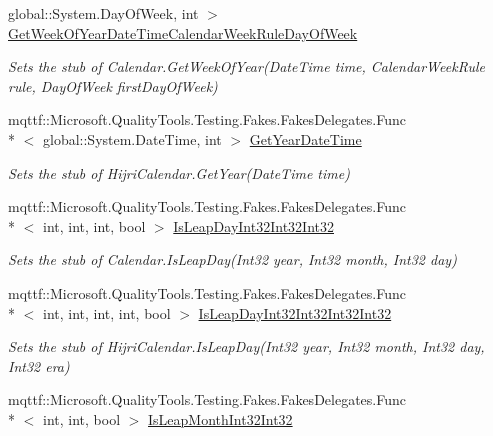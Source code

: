 \begin{DoxyCompactItemize}
global\-::\-System.\-Day\-Of\-Week, int $>$ \hyperlink{class_system_1_1_globalization_1_1_fakes_1_1_stub_hijri_calendar_a2c01dec10f24678568a180ce995d7b8c}{Get\-Week\-Of\-Year\-Date\-Time\-Calendar\-Week\-Rule\-Day\-Of\-Week}
\begin{DoxyCompactList}\small\item\em Sets the stub of Calendar.\-Get\-Week\-Of\-Year(\-Date\-Time time, Calendar\-Week\-Rule rule, Day\-Of\-Week first\-Day\-Of\-Week)\end{DoxyCompactList}\item 
mqttf\-::\-Microsoft.\-Quality\-Tools.\-Testing.\-Fakes.\-Fakes\-Delegates.\-Func\\*
$<$ global\-::\-System.\-Date\-Time, int $>$ \hyperlink{class_system_1_1_globalization_1_1_fakes_1_1_stub_hijri_calendar_a1ad2b061ae2eb559aa563aaac04d6aa9}{Get\-Year\-Date\-Time}
\begin{DoxyCompactList}\small\item\em Sets the stub of Hijri\-Calendar.\-Get\-Year(\-Date\-Time time)\end{DoxyCompactList}\item 
mqttf\-::\-Microsoft.\-Quality\-Tools.\-Testing.\-Fakes.\-Fakes\-Delegates.\-Func\\*
$<$ int, int, int, bool $>$ \hyperlink{class_system_1_1_globalization_1_1_fakes_1_1_stub_hijri_calendar_ac699c2ca19599f059223ee1640838876}{Is\-Leap\-Day\-Int32\-Int32\-Int32}
\begin{DoxyCompactList}\small\item\em Sets the stub of Calendar.\-Is\-Leap\-Day(\-Int32 year, Int32 month, Int32 day)\end{DoxyCompactList}\item 
mqttf\-::\-Microsoft.\-Quality\-Tools.\-Testing.\-Fakes.\-Fakes\-Delegates.\-Func\\*
$<$ int, int, int, int, bool $>$ \hyperlink{class_system_1_1_globalization_1_1_fakes_1_1_stub_hijri_calendar_a72f8c42b6d6152df9014bf0528c63c2b}{Is\-Leap\-Day\-Int32\-Int32\-Int32\-Int32}
\begin{DoxyCompactList}\small\item\em Sets the stub of Hijri\-Calendar.\-Is\-Leap\-Day(\-Int32 year, Int32 month, Int32 day, Int32 era)\end{DoxyCompactList}\item 
mqttf\-::\-Microsoft.\-Quality\-Tools.\-Testing.\-Fakes.\-Fakes\-Delegates.\-Func\\*
$<$ int, int, bool $>$ \hyperlink{class_system_1_1_globalization_1_1_fakes_1_1_stub_hijri_calendar_ac6a839ee63a7edc77bc63e53cf551307}{Is\-Leap\-Month\-Int32\-Int32}

\end{DoxyCompactItemize}
